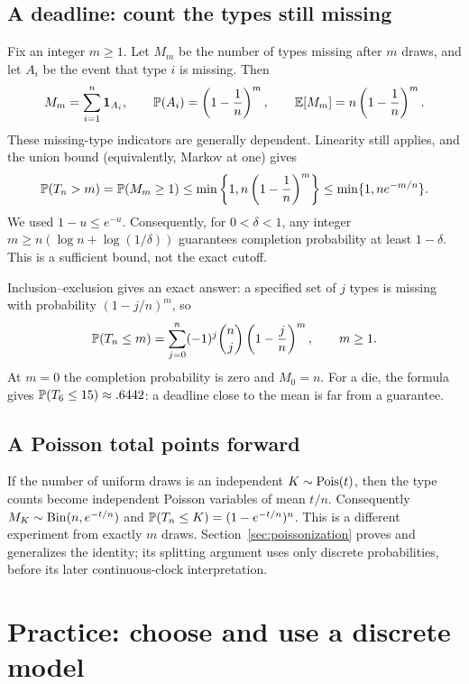 \subsection*{A deadline: count the types still missing}
Fix an integer $m\ge1$. Let $M_m$ be the number of types missing after
$m$ draws, and let $A_i$ be the event that type $i$ is missing.
Then
\[
 M_m=\sum_{i=1}^n\ind_{A_i},\qquad
 \P(A_i)=\left(1-\frac1n\right)^m,\qquad
 \E[M_m]=n\left(1-\frac1n\right)^m.
\]
These missing-type indicators are generally dependent. Linearity still
applies, and the union bound (equivalently, Markov at one) gives
\begin{equation}
 \P(T_n>m)=\P(M_m\ge1)
 \le\min\left\{1,n\left(1-\frac1n\right)^m\right\}
 \le\min\{1,ne^{-m/n}\}.
 \label{eq:coupon-tail-bound}
\end{equation}
We used $1-u\le e^{-u}$. Consequently, for $0<\delta<1$, any integer
$m\ge n(\log n+\log(1/\delta))$ guarantees completion probability
at least $1-\delta$. This is a sufficient bound, not the exact cutoff.

Inclusion--exclusion gives an exact answer: a specified set of $j$ types
is missing with probability $(1-j/n)^m$, so
\begin{equation}
 \P(T_n\le m)=\sum_{j=0}^n(-1)^j\binom nj
                         \left(1-\frac jn\right)^m,\qquad m\ge1.
 \label{eq:coupon-cdf}
\end{equation}
At $m=0$ the completion probability is zero and $M_0=n$.
For a die, the formula gives $\P(T_6\le15)\approx.6442$:
a deadline close to the mean is far from a guarantee.



\subsection*{A Poisson total points forward}
If the number of uniform draws is an independent $K\sim\Pois(t)$,
then the type counts become independent Poisson variables of mean $t/n$.
Consequently $M_K\sim\Bin(n,e^{-t/n})$ and
$\P(T_n\le K)=(1-e^{-t/n})^n$. This is a different experiment from
exactly $m$ draws. Section~\ref{sec:poissonization} proves and generalizes
the identity; its splitting argument uses only discrete probabilities,
before its later continuous-clock interpretation.

\section{Practice: choose and use a discrete model}
\label{sec:discrete-distribution-exercises}

